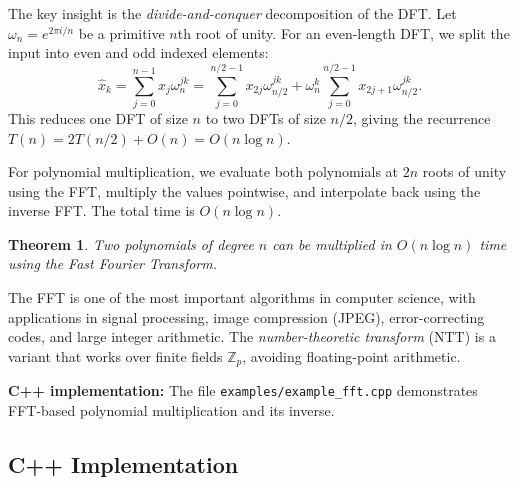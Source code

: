 \documentclass[twoside,12pt]{book}
\theoremstyle{plain}
\newtheorem{theorem}{Theorem}[chapter]
\theoremstyle{definition}
\theoremstyle{remark}
\newenvironment{cpplisting}{\begin{center}\small}{\end{center}}
\begin{document}
The key insight is the \emph{divide-and-conquer} decomposition of the DFT. Let $\omega_n = e^{2\pi i/n}$ be a primitive $n$th root of unity. For an even-length DFT, we split the input into even and odd indexed elements:
\[
\hat{x}_k = \sum_{j=0}^{n-1} x_j \omega_n^{jk} = \sum_{j=0}^{n/2-1} x_{2j} \omega_{n/2}^{jk} + \omega_n^k \sum_{j=0}^{n/2-1} x_{2j+1} \omega_{n/2}^{jk}.
\]
This reduces one DFT of size $n$ to two DFTs of size $n/2$, giving the recurrence $T(n) = 2T(n/2) + O(n) = O(n \log n)$.

For polynomial multiplication, we evaluate both polynomials at $2n$ roots of unity using the FFT, multiply the values pointwise, and interpolate back using the inverse FFT. The total time is $O(n \log n)$.

\begin{theorem}\label{thm:fft-mul}
Two polynomials of degree $n$ can be multiplied in $O(n \log n)$ time using the Fast Fourier Transform.
\end{theorem}

The FFT is one of the most important algorithms in computer science, with applications in signal processing, image compression (JPEG), error-correcting codes, and large integer arithmetic. The \emph{number-theoretic transform} (NTT) is a variant that works over finite fields $\mathbb{Z}_p$, avoiding floating-point arithmetic.

\begin{cpplisting}
\textbf{C++ implementation:} The file \texttt{examples/example\_fft.cpp} demonstrates FFT-based polynomial multiplication and its inverse.
\end{cpplisting}


\subsection*{C++ Implementation}






\end{document}

